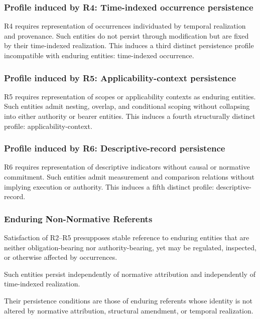 \subsubsection{Profile induced by R4: Time-indexed occurrence persistence}

R4 requires representation of occurrences individuated by temporal realization and provenance.
Such entities do not persist through modification but are fixed by their time-indexed realization.
This induces a third distinct persistence profile incompatible with enduring entities: time-indexed occurrence.

\subsubsection{Profile induced by R5: Applicability-context persistence}

R5 requires representation of scopes or applicability contexts as enduring entities.
Such entities admit nesting, overlap, and conditional scoping without collapsing into either authority or bearer entities.
This induces a fourth structurally distinct profile: applicability-context.

\subsubsection{Profile induced by R6: Descriptive-record persistence}

R6 requires representation of descriptive indicators without causal or normative commitment.
Such entities admit measurement and comparison relations without implying execution or authority.
This induces a fifth distinct profile: descriptive-record.

\subsubsection{Enduring Non-Normative Referents}

Satisfaction of R2--R5 presupposes stable reference to enduring
entities that are neither obligation-bearing nor authority-bearing,
yet may be regulated, inspected, or otherwise affected by occurrences.

Such entities persist independently of normative attribution
and independently of time-indexed realization.

Their persistence conditions are those of enduring referents
whose identity is not altered by normative attribution,
structural amendment, or temporal realization.


